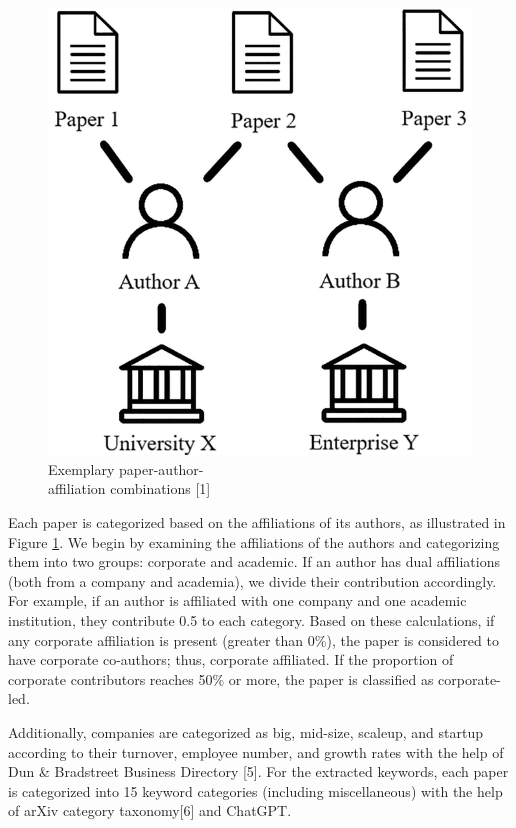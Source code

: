 \documentclass{article}
\begin{document}
\begin{figure}
\centering
\vspace{-10pt}
\includegraphics[width=.95\linewidth]{report/images/affiliation-combination.png}
\caption{Exemplary paper-author-\\
affiliation combinations [1]}
\label{fig:affiliation-combination}
\vspace{-20pt}
\end{figure}
Each paper is categorized based on the affiliations of its authors, as illustrated in Figure \ref{fig:affiliation-combination}. We begin by examining the affiliations of the authors and categorizing them into two groups: corporate and academic. If an author has dual affiliations (both from a company and academia), we divide their contribution accordingly. For example, if an author is affiliated with one company and one academic institution, they contribute 0.5 to each category. Based on these calculations, if any corporate affiliation is present (greater than 0\%), the paper is considered to have corporate co-authors; thus, corporate affiliated. If the proportion of corporate contributors reaches 50\% or more, the paper is classified as corporate-led.

Additionally, companies are categorized as big, mid-size, scaleup, and startup according to their turnover, employee number, and growth rates with the help of Dun \& Bradstreet Business Directory [5]. For the extracted keywords, each paper is categorized into 15 keyword categories (including miscellaneous) with the help of arXiv category taxonomy[6] and ChatGPT. 
\end{document}
